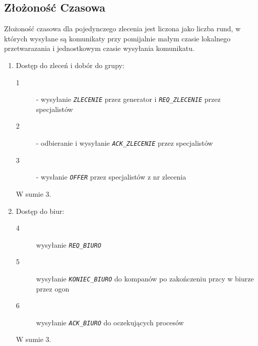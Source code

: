 \documentclass[12pt]{article}
\newcommand{\msg}[1]{\texttt{\emph{#1}}}
\begin{document}
\subsection{Złożoność Czasowa}
Złożoność czasowa dla pojedynczego zlecenia jest liczona jako liczba rund, w których wysyłane są komunikaty przy pomijalnie małym czasie lokalnego przetwarazania i jednostkowym czasie wysyłania komunikatu.
\begin{enumerate}
	\item Dostęp do zleceń i dobór do grupy:
	\begin{description}
		\item[1] - wysyłanie \msg{ZLECENIE} przez generator i \msg{REQ\_ZLECENIE} przez specjalistów
		\item[2] - odbieranie i wysyłanie \msg{ACK\_ZLECENIE} przez specjalistów
		\item[3] - wysłanie \msg{OFFER} przez specjalistów z nr zlecenia
	\end{description}
	W sumie 3.
	
	\item Dostęp do biur:
	\begin{description}
		\item[4] wysyłanie \msg{REQ\_BIURO}
		\item[5] wysyłanie \msg{KONIEC\_BIURO} do kompanów po zakończeniu przcy w biurze przez ogon
		\item[6] wysyłanie \msg{ACK\_BIURO} do oczekujących procesów
	\end{description}
	W sumie 3.
	

\end{enumerate}
\end{document}
